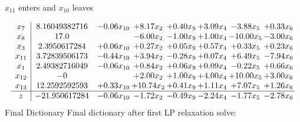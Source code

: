 \documentclass[8pt]{article}
\begin{document}
 $ x_{11} $ enters and $ x_{10} $ leaves 

 \[\begin{array}{c| c c@{\hskip 2pt} c@{\hskip 2pt} c@{\hskip 2pt} c@{\hskip 2pt} c@{\hskip 2pt} c@{\hskip 2pt} }
 x_{7}   &  8.16049382716 & -0.06 x_{10} & +  8.17 x_{2} & +  0.40 x_{9} & +  3.09 x_{4} & -3.88 x_{5} & +  0.33 x_{6}\\
 x_{8}   &  17.0  &   & -6.00 x_{2} & -1.00 x_{9} & +  1.00 x_{4} & -10.00 x_{5} & -3.00 x_{6}\\
 x_{3}   &  2.3950617284 & +  0.06 x_{10} & +  0.27 x_{2} & +  0.05 x_{9} & +  0.57 x_{4} & +  0.33 x_{5} & +  0.23 x_{6}\\
 x_{11}   &  3.72839506173 & -0.44 x_{10} & +  3.94 x_{2} & -0.28 x_{9} & +  0.07 x_{4} & +  6.49 x_{5} & -7.94 x_{6}\\
 x_{1}   &  2.49382716049 & -0.06 x_{10} & +  0.84 x_{2} & +  0.06 x_{9} & +  0.09 x_{4} & -0.22 x_{5} & +  0.66 x_{6}\\
 x_{12}   &  -0  &   & +  2.00 x_{2} & +  1.00 x_{9} & +  4.00 x_{4} & + 10.00 x_{5} & +  3.00 x_{6}\\
 x_{13}   &  12.2592592593 & +  0.33 x_{10} & + 10.74 x_{2} & +  0.41 x_{9} & +  1.11 x_{4} & +  7.07 x_{5} & +  1.26 x_{6}\\
\hline
z    &  -21.950617284 & -0.06 x_{10} & -1.72 x_{2} & -0.49 x_{9} & -2.24 x_{4} & -1.77 x_{5} & -2.78 x_{6}\\
\end{array}\]
Final Dictionary
Final dictionary after first LP relaxation solve: 
\end{document}
